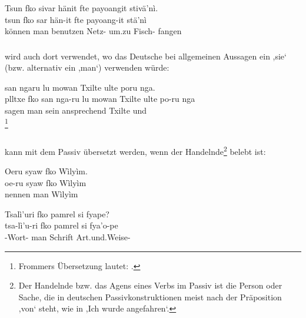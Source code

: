 \begin{interlin}
	\glll \Npawl{}Tsun fko sivar hänit fte payoangit stivä'nì. \\
	tsun fko sar hän-it fte payoang-it stä'nì \\
	können man benutzen Netz- um.zu Fisch- fangen \\
\end{interlin}

\subsubsection{}  wird auch dort verwendet, wo das Deutsche bei allgemeinen Aussagen ein ,sie‘ (bzw. alternativ ein ,man‘) verwenden würde: 

\begin{interlin}
	\glll \Npawl{}  san ngaru lu mowan Txilte ulte poru nga. \\
	plltxe fko san nga-ru lu mowan Txilte ulte po-ru nga \\
	sagen man   sein ansprechend Txilte und   \\
	\footnote{Frommers Übersetzung lautet: .}
\end{interlin}

\subsubsection{}  kann mit dem Passiv übersetzt werden, wenn der Handelnde\footnote{Der Handelnde bzw. das Agens eines Verbs im Passiv ist die Person oder Sache, die in deutschen Passivkonstruktionen meist nach der Präposition ,von‘ steht, wie in ,Ich wurde  angefahren‘.} belebt ist: \label{syn:prn:fko}

\begin{interlin}
	\glll Oeru syaw fko Wìlyìm. \\
	oe-ru syaw fko Wìlyìm \\
	 nennen man Wìlyìm \\
\end{interlin}

\begin{interlin}
	\glll \Npawl{}Tsalì'uri fko pamrel si fyape? \\
	tsa-lì'u-ri fko pamrel si fya'o-pe \\
	-Wort- man Schrift  Art.und.Weise- \\
	\end{interlin}

